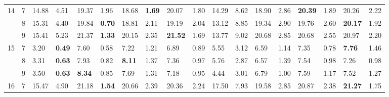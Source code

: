 \documentclass[conference]{IEEEtran}
\begin{document}
\begin{table*}[]
\begin{tabular}{|cl|ll|ll|ll|ll|ll|ll|ll|ll|}
		\multicolumn{1}{|c|}{\multirow{3}{*}{14}} & 7 & \multicolumn{1}{l|}{14.88} & 4.51 & \multicolumn{1}{l|}{19.37} & 1.96 & \multicolumn{1}{l|}{18.68} & \textbf{1.69} & \multicolumn{1}{l|}{20.07} & 1.80 & \multicolumn{1}{l|}{14.29} & 8.62 & \multicolumn{1}{l|}{18.90} & 2.86 & \multicolumn{1}{l|}{\textbf{20.39}} & 1.89 & \multicolumn{1}{l|}{20.26} & 2.22 \\ \cline{2-18} 
		\multicolumn{1}{|c|}{} & 8 & \multicolumn{1}{l|}{15.31} & 4.40 & \multicolumn{1}{l|}{19.84} & \textbf{0.70} & \multicolumn{1}{l|}{18.81} & 2.11 & \multicolumn{1}{l|}{19.19} & 2.04 & \multicolumn{1}{l|}{13.12} & 8.85 & \multicolumn{1}{l|}{19.34} & 2.90 & \multicolumn{1}{l|}{19.76} & 2.60 & \multicolumn{1}{l|}{\textbf{20.17}} & 1.92 \\ \cline{2-18} 
		\multicolumn{1}{|c|}{} & 9 & \multicolumn{1}{l|}{15.41} & 5.23 & \multicolumn{1}{l|}{21.37} & \textbf{1.33} & \multicolumn{1}{l|}{20.15} & 2.35 & \multicolumn{1}{l|}{\textbf{21.52}} & 1.69 & \multicolumn{1}{l|}{13.77} & 9.02 & \multicolumn{1}{l|}{20.68} & 2.85 & \multicolumn{1}{l|}{20.68} & 2.55 & \multicolumn{1}{l|}{20.97} & 2.20 \\ \hline
		\multicolumn{1}{|c|}{\multirow{3}{*}{15}} & 7 & \multicolumn{1}{l|}{3.20} & \textbf{0.49} & \multicolumn{1}{l|}{7.60} & 0.58 & \multicolumn{1}{l|}{7.22} & 1.21 & \multicolumn{1}{l|}{6.89} & 0.89 & \multicolumn{1}{l|}{5.55} & 3.12 & \multicolumn{1}{l|}{6.59} & 1.14 & \multicolumn{1}{l|}{7.35} & 0.78 & \multicolumn{1}{l|}{\textbf{7.76}} & 1.46 \\ \cline{2-18} 
		\multicolumn{1}{|c|}{} & 8 & \multicolumn{1}{l|}{3.31} & \textbf{0.63} & \multicolumn{1}{l|}{7.93} & 0.82 & \multicolumn{1}{l|}{\textbf{8.11}} & 1.37 & \multicolumn{1}{l|}{7.36} & 0.97 & \multicolumn{1}{l|}{5.76} & 2.87 & \multicolumn{1}{l|}{6.57} & 1.39 & \multicolumn{1}{l|}{7.54} & 0.98 & \multicolumn{1}{l|}{7.26} & 0.98 \\ \cline{2-18} 
		\multicolumn{1}{|c|}{} & 9 & \multicolumn{1}{l|}{3.50} & \textbf{0.63} & \multicolumn{1}{l|}{\textbf{8.34}} & 0.85 & \multicolumn{1}{l|}{7.69} & 1.31 & \multicolumn{1}{l|}{7.18} & 0.95 & \multicolumn{1}{l|}{4.44} & 3.01 & \multicolumn{1}{l|}{6.79} & 1.00 & \multicolumn{1}{l|}{7.59} & 1.17 & \multicolumn{1}{l|}{7.52} & 1.27 \\ \hline
		\multicolumn{1}{|c|}{\multirow{3}{*}{16}} & 7 & \multicolumn{1}{l|}{15.47} & 4.90 & \multicolumn{1}{l|}{21.18} & \textbf{1.54} & \multicolumn{1}{l|}{20.66} & 2.39 & \multicolumn{1}{l|}{20.36} & 2.24 & \multicolumn{1}{l|}{17.50} & 7.93 & \multicolumn{1}{l|}{19.58} & 2.85 & \multicolumn{1}{l|}{20.87} & 2.38 & \multicolumn{1}{l|}{\textbf{21.27}} & 1.75 \\ \cline{2-18} 

\end{tabular}
\end{table*}
\end{document}
